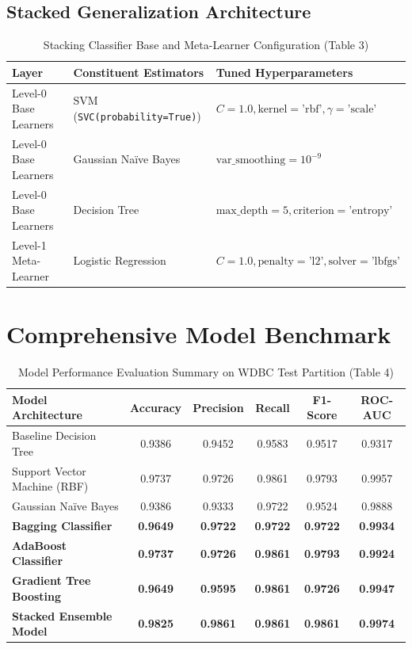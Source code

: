 \documentclass[12pt,a4paper]{article}
\begin{document}
\subsection{Stacked Generalization Architecture}
\begin{table}[H]
\centering
\caption{Stacking Classifier Base and Meta-Learner Configuration (Table 3)}
\label{tab:stacking_tuning}
\begin{tabular}{|p{4.5cm}|p{5.5cm}|p{4.5cm}|}
\hline
\textbf{Layer} & \textbf{Constituent Estimators} & \textbf{Tuned Hyperparameters}\\ \hline
Level-0 Base Learners & SVM (\texttt{SVC(probability=True)}) & $C=1.0, \text{kernel}=\text{'rbf'}, \gamma=\text{'scale'}$\\ \hline
Level-0 Base Learners & Gaussian Na\"ive Bayes & $\text{var\_smoothing}=10^{-9}$\\ \hline
Level-0 Base Learners & Decision Tree & $\text{max\_depth}=5, \text{criterion}=\text{'entropy'}$\\ \hline
Level-1 Meta-Learner & Logistic Regression & $C=1.0, \text{penalty}=\text{'l2'}, \text{solver}=\text{'lbfgs'}$\\ \hline
\end{tabular}
\end{table}

\section{Comprehensive Model Benchmark}

\begin{table}[H]
\centering
\caption{Model Performance Evaluation Summary on WDBC Test Partition (Table 4)}
\label{tab:model_comparison}
\begin{tabular}{|l|c|c|c|c|c|}
\hline
\textbf{Model Architecture} & \textbf{Accuracy} & \textbf{Precision} & \textbf{Recall} & \textbf{F1-Score} & \textbf{ROC-AUC}\\ \hline
Baseline Decision Tree & 0.9386 & 0.9452 & 0.9583 & 0.9517 & 0.9317\\ \hline
Support Vector Machine (RBF) & 0.9737 & 0.9726 & 0.9861 & 0.9793 & 0.9957\\ \hline
Gaussian Na\"ive Bayes & 0.9386 & 0.9333 & 0.9722 & 0.9524 & 0.9888\\ \hline
\textbf{Bagging Classifier} & \textbf{0.9649} & \textbf{0.9722} & \textbf{0.9722} & \textbf{0.9722} & \textbf{0.9934}\\ \hline
\textbf{AdaBoost Classifier} & \textbf{0.9737} & \textbf{0.9726} & \textbf{0.9861} & \textbf{0.9793} & \textbf{0.9924}\\ \hline
\textbf{Gradient Tree Boosting} & \textbf{0.9649} & \textbf{0.9595} & \textbf{0.9861} & \textbf{0.9726} & \textbf{0.9947}\\ \hline
\textbf{Stacked Ensemble Model} & \textbf{0.9825} & \textbf{0.9861} & \textbf{0.9861} & \textbf{0.9861} & \textbf{0.9974}\\ \hline
\end{tabular}
\end{table}
\end{document}
